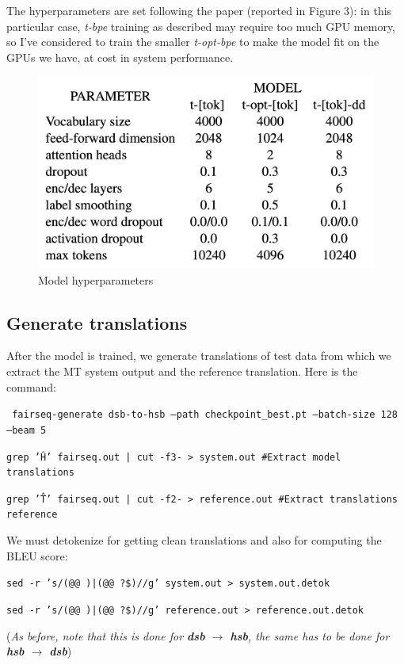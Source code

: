 \documentclass[12pt]{article}
\begin{document}
\newpage

The hyperparameters are set following the paper (reported in Figure 3):
in this particular case, \textit{t-bpe} training as described
may require too much GPU memory, so I've considered to train the smaller \textit{t-opt-bpe} to make the model fit on the GPUs we have, at cost in system performance.

\begin{figure}
    \centering
    \includegraphics[width=0.7\linewidth]{report/figures/hyperparameters.png}
    \caption{Model hyperparameters}
    \label{fig:hyperparameters}
\end{figure}

\subsection{Generate translations}
After the model is trained, we generate translations of test data from which we extract the MT system output and the reference translation. Here is the command:

\vspace{0.2cm}
\texttt{
fairseq-generate dsb-to-hsb --path checkpoint\_best.pt --batch-size 128 --beam 5}

\vspace{0.2cm}
\texttt{grep '\^H' fairseq.out | cut -f3- > system.out \#Extract model translations}

\texttt{grep '\^T' fairseq.out | cut -f2- > reference.out \#Extract translations reference}

\vspace{0.2cm}
We must detokenize for getting clean translations and also for computing the BLEU score:

\vspace{0.2cm}
\texttt{sed -r 's/(@@ )|(@@ ?\$)//g' system.out > system.out.detok}

\texttt{sed -r 's/(@@ )|(@@ ?\$)//g' reference.out > reference.out.detok}

\vspace{0.2cm}
{\centering
(\textit{As before, note that this is done for \textbf{dsb} $\rightarrow$ \textbf{hsb}, the same has to be done for \textbf{hsb} $\rightarrow$ \textbf{dsb}})\par
}
\end{document}
